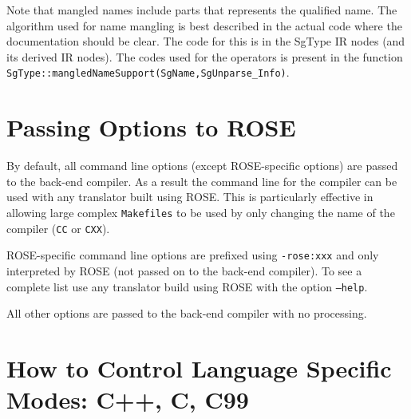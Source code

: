    Note that mangled names include parts that represents the qualified name.
The algorithm used for name mangling is best described in the actual code
where the documentation should be clear. The code for this is in the 
SgType IR nodes (and its derived IR nodes).  The codes used for the operators is
present in the function {\tt SgType::mangledNameSupport(SgName,SgUnparse\_Info)}.

\section{Passing Options to ROSE}

    By default, all command line options (except ROSE-specific options) are 
passed to the back-end compiler.  As a result the command line for the compiler
can be used with any translator built using ROSE.  This is particularly effective
in allowing large complex {\tt Makefiles} to be used by only changing the name of the 
compiler ({\tt CC} or {\tt CXX}).

    ROSE-specific command line options are prefixed using {\tt -rose:xxx}
and only interpreted by ROSE (not passed on to the back-end compiler).  To see 
a complete list use any translator build using ROSE with the option {\tt --help}.

     All other options are passed to the back-end compiler with no processing.


\section{How to Control Language Specific Modes: C++, C, C99}

